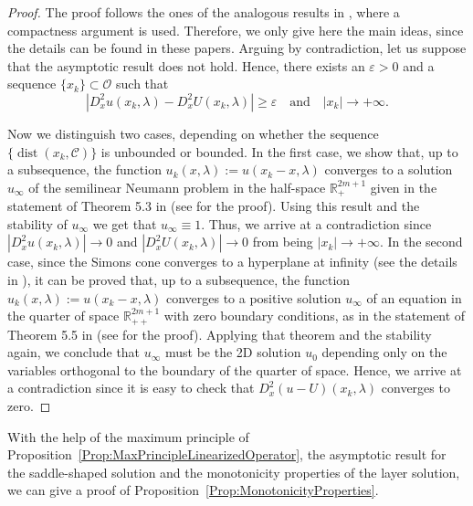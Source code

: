 \documentclass[12pt,reqno]{amsart}
\theoremstyle{definition}
\theoremstyle{remark}
\newcommand{\con}[1]{\mathbb{#1}}
\newcommand{\R}{\con{R}} %
\newcommand{\ccal}{\mathscr{C}}
\newcommand{\ocal}{\mathcal{O}}
\DeclareMathOperator{\dist}{dist}
\numberwithin{equation}{section}
\begin{document}
\begin{proof}
The proof follows the ones of the analogous results in \cite{Cinti-Saddle2,Cabre-Saddle,CabreTerraII}, where a compactness argument is used. Therefore, we only give here the main ideas, since the details can be found in these papers. Arguing by contradiction, let us suppose that the asymptotic result does not hold. Hence, there exists an $\varepsilon>0$ and a sequence $\{x_k\}\subset \ocal$ such that 
$$ |D^2_x u(x_k,\lambda)-D^2_xU(x_k,\lambda)| \geq \varepsilon \ \ \ \text{ and } \ \ \ |x_k|\to+\infty. $$

Now we distinguish two cases, depending on whether the sequence $\{ \dist(x_k, \ccal) \}$ is unbounded or bounded. In the first case, we show that, up to a subsequence, the function $u_k(x,\lambda) := u(x_k-x,\lambda)$ converges to a solution $u_\infty$ of the semilinear Neumann problem in the half-space $\R^{2m+1}_+$ given in the statement of Theorem 5.3 in \cite{Cinti-Saddle2} (see \cite{LiZhang} for the proof). Using this result and the stability of $u_\infty$ we get that $u_\infty \equiv 1$. Thus, we arrive at a contradiction since $|D^2_x u(x_k,\lambda)| \to 0$ and $|D^2_x U(x_k,\lambda)| \to 0$ from being $|x_k| \to +\infty$. In the second case, since the Simons cone converges to a hyperplane at infinity (see the details in \cite{CabreTerraII}), it can be proved that, up to a subsequence, the function $u_k(x,\lambda) := u(x_k-x,\lambda)$ converges to a positive solution $u_\infty$ of an equation in the quarter of space $\R^{2m+1}_{++}$ with zero boundary conditions, as in the statement of Theorem 5.5 in \cite{Cinti-Saddle2} (see \cite{Tan} for the proof). Applying that theorem and the stability again, we conclude that $u_\infty$ must be the 2D solution $u_0$ depending only on the variables orthogonal to the boundary of the quarter of space. Hence, we arrive at a contradiction since it is easy to check that $D^2_x(u-U)(x_k,\lambda)$ converges to zero.
\end{proof}

With the help of the maximum principle of Proposition~\ref{Prop:MaxPrincipleLinearizedOperator}, the asymptotic result for the saddle-shaped solution and the monotonicity properties of the layer solution, we can give a proof of Proposition~\ref{Prop:MonotonicityProperties}.
\end{document}
